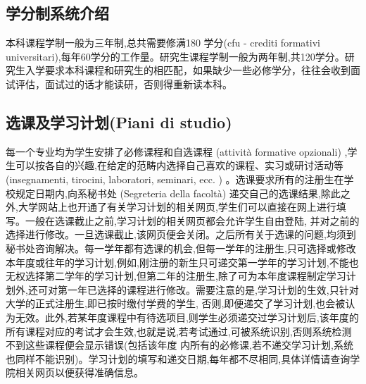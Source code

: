 \subsection{学分制系统介绍}
本科课程学制一般为三年制,总共需要修满180 学分(cfu - crediti formativi universitari),每年60学分的工作量。研究生课程学制一般为两年制,共120学分。研究生入学要求本科课程和研究生的相匹配，如果缺少一些必修学分，往往会收到面试评估，面试过的话才能读研，否则得重新读本科。 

\subsection{选课及学习计划(Piani di studio)}
每一个专业均为学生安排了必修课程和自选课程 (attività formative opzionali) ,学生可以按各自的兴趣,在给定的范畴内选择自己喜欢的课程、实习或研讨活动等(insegnamenti, tirocini, laboratori, seminari, ecc. ) 。选课要求所有的注册生在学校规定日期内,向系秘书处 (Segreteria della facoltà) 递交自己的选课结果,除此之外,大学网站上也开通了有关学习计划的相关网页,学生们可以直接在网上进行填写。一般在选课截止之前,学习计划的相关网页都会允许学生自由登陆, 并对之前的选择进行修改。一旦选课截止,该网页便会关闭。之后所有关于选课的问题,均须到秘书处咨询解决。每一学年都有选课的机会,但每一学年的注册生,只可选择或修改本年度或往年的学习计划,例如,刚注册的新生只可递交第一学年的学习计划,不能也无权选择第二学年的学习计划,但第二年的注册生,除了可为本年度课程制定学习计划外,还可对第一年已选择的课程进行修改。需要注意的是,学习计划的生效,只针对大学的正式注册生,即已按时缴付学费的学生, 否则,即便递交了学习计划,也会被认为无效。此外,若某年度课程中有待选项目,则学生必须递交过学习计划后,该年度的所有课程对应的考试才会生效,也就是说,若考试通过,可被系统识别,否则系统检测不到这些课程便会显示错误(包括该年度 内所有的必修课,若不递交学习计划,系统也同样不能识别)。学习计划的填写和递交日期,每年都不尽相同,具体详情请查询学院相关网页以便获得准确信息。 


